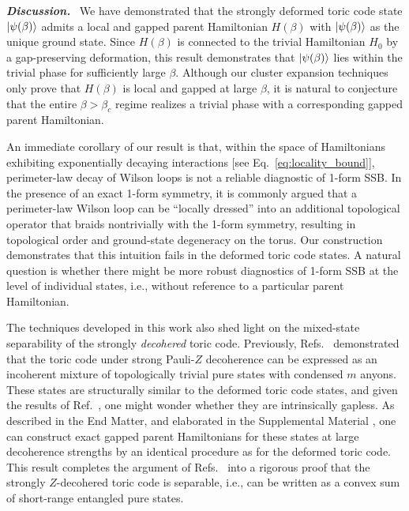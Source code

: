 \documentclass[aps,prl,twocolumn,floatfix,nofootinbib]{revtex4-2}
\theoremstyle{definition}
\begin{document}
\textbf{\textit{Discussion.}}~
We have demonstrated that the strongly deformed toric code state $\ket{\psi(\beta)}$ admits a local and gapped parent Hamiltonian $H(\beta)$ with $\ket{\psi(\beta)}$ as the unique ground state. Since $H(\beta)$ is connected to the trivial Hamiltonian $H_0$ by a gap-preserving deformation, this result demonstrates that $\ket{\psi(\beta)}$ lies within the trivial phase for sufficiently large $\beta$. 
Although our cluster expansion techniques only prove that $H(\beta)$ is local and gapped at large $\beta$, it is natural to conjecture that the entire $\beta > \beta_c$ regime realizes a trivial phase with a corresponding gapped parent Hamiltonian.

An immediate corollary of our result is that, within the space of Hamiltonians exhibiting exponentially decaying interactions [see Eq.~\eqref{eq:locality_bound}], perimeter-law decay of Wilson loops is not a reliable diagnostic of 1-form SSB. In the presence of an exact 1-form symmetry, it is commonly argued \cite{Gaiotto2015,McGreevyGLP2023} that a perimeter-law Wilson loop can be ``locally dressed'' into an additional topological operator that braids nontrivially with the 1-form symmetry, resulting in topological order and ground-state degeneracy on the torus. Our construction demonstrates that this intuition fails in the deformed toric code states. A natural question is whether there might be more robust diagnostics of 1-form SSB at the level of individual states, i.e., without reference to a particular parent Hamiltonian. 

The techniques developed in this work also shed light on the mixed-state separability of the strongly \emph{decohered} toric code. Previously, Refs.~ demonstrated that the toric code under strong Pauli-$Z$ decoherence can be expressed as an incoherent mixture of topologically trivial pure states with condensed $m$ anyons. These states are structurally similar to the deformed toric code states, and given the results of Ref.~, one might wonder whether they are intrinsically gapless. As described in the End Matter, and elaborated in the Supplemental Material \cite{SOM}, one can construct exact gapped parent Hamiltonians for these states at large decoherence strengths by an identical procedure as for the deformed toric code. This result completes the argument of Refs.~ into a rigorous proof that the strongly $Z$-decohered toric code is separable, i.e., can be written as a convex sum of short-range entangled pure states.
\end{document}
